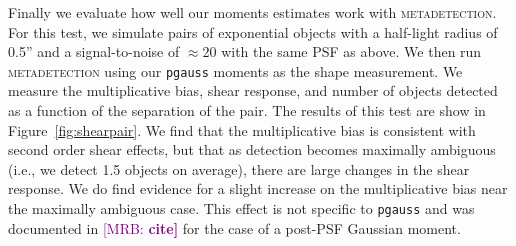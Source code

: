 \documentclass[twocolappendix, appendixfloats, numberedappendix, twocolumn, apj]{openjournal}
\newcommand{\mrb}[1]{\textcolor{purple}{[MRB: \bf #1]}\xspace}
\newcommand{\mdet}{\textsc{metadetection}\xspace}
\newcommand{\pgauss}{\texttt{pgauss}\xspace}
\begin{document}
Finally we evaluate how well our moments estimates work with \mdet. For this test,
we simulate pairs of exponential objects with a half-light radius of 0.5'' and a
signal-to-noise of $\approx20$ with the same PSF as above. We then run \mdet using our \pgauss
moments as the shape measurement. We measure the multiplicative bias, shear response, and
number of objects detected as a function of the separation of the pair. The results
of this test are show in Figure~\ref{fig:shearpair}. We find that the multiplicative
bias is consistent with second order shear effects, but that as detection
becomes maximally ambiguous (i.e., we detect 1.5 objects on average), there are large
changes in the shear response. We do find evidence for a slight increase on the
multiplicative bias near the maximally ambiguous case. This effect is not specific to \pgauss
and was documented in \mrb{cite} for the case of a post-PSF Gaussian moment.
\end{document}
